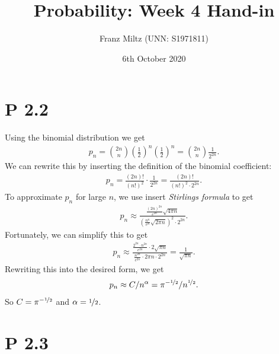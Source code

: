\documentclass{article}
\begin{document}
\title{Probability: Week 4 Hand-in}
\author{Franz Miltz (UNN: S1971811)}
\date{6th October 2020}
\maketitle


\section*{P 2.2}


Using the binomial distribution we get
\begin{align*}
  p_n = \binom{2n}{n}\left(\frac{1}{2}\right)^n\left(\frac{1}{2}\right)^n
  =\binom{2n}{n}\frac{1}{2^{2n}}.
\end{align*}
We can rewrite this by inserting the definition of the binomial
coefficient:
\begin{align*}
  p_n = \frac{(2n)!}{(n!)^2}\cdot\frac{1}{2^{2n}}=\frac{(2n)!}{(n!)^2\cdot 2^{2n}}.
\end{align*}
To approximate $p_n$ for large $n$, we use insert \emph{Stirlings formula}
to get
\begin{align*}
  p_n \approx \frac{
    \frac{(2n)^{2n}}{e^{2n}}\sqrt{4\pi n}
  }{
    \left(\frac{n^n}{e^n}\sqrt{2\pi n}\right)^2\cdot 2^{2n}}.
\end{align*}
Fortunately, we can simplify this to get
\begin{align*}
  p_n\approx \frac{
    \frac{2^{2n}\cdot n^{2n}}{e^{2n}}\cdot2\sqrt{\pi n}
  }{
    \frac{n^{2n}}{e^{2n}}\cdot 2\pi n\cdot 2^{2n}}=\frac{1}{\sqrt{\pi n}}.
\end{align*}
Rewriting this into the desired form, we get
\begin{align*}
  p_n\approx C / n^\alpha = \pi^{-\nicefrac{1}{2}}/n^{\nicefrac{1}{2}}.
\end{align*}
So $C=\pi^{-\nicefrac{1}{2}}$ and $\alpha=\nicefrac{1}{2}$.


\section*{P 2.3}
\end{document}
